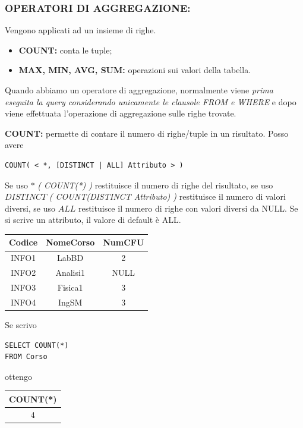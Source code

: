 \documentclass{article}
\begin{document}
\subsubsection{OPERATORI DI AGGREGAZIONE:}
Vengono applicati ad un insieme di righe. \begin{itemize}
	\item \textbf{COUNT:} conta le tuple;
	\item \textbf{MAX, MIN, AVG, SUM:} operazioni sui valori della tabella.
\end{itemize}

Quando abbiamo un operatore di aggregazione, normalmente viene \textit{prima eseguita la query considerando unicamente le clausole FROM e WHERE} e dopo viene effettuata l'operazione di aggregazione sulle righe trovate.

\textbf{COUNT:} permette di contare il numero di righe/tuple in un risultato. Posso avere 
\begin{lstlisting}[style=sqlstyle]
COUNT( < *, [DISTINCT | ALL] Attributo > ) 
\end{lstlisting} 

Se uso $*$ \textit{( COUNT(*) )} restituisce il numero di righe del risultato, se uso $DISTINCT$ \textit{( COUNT(DISTINCT Attributo) )} restituisce il numero di valori diversi, se uso $ALL$ restituisce il numero di righe con valori diversi da NULL. Se si scrive un attributo, il valore di default è ALL.

\begin{table}[h!]
	\begin{tabular}{|c|c|c|}
		\hline
		Codice & NomeCorso & NumCFU \\
		\hline
		INFO1 & LabBD & 2 \\
		\hline
		INFO2 & Analisi1 & NULL \\
		\hline
		INFO3 & Fisica1 & 3 \\
		\hline
		INFO4 & IngSM & 3 \\
		\hline
	\end{tabular}
\end{table}

Se scrivo \hfill\begin{minipage}{0.33\textwidth}
\begin{lstlisting}[style=sqlstyle]
SELECT COUNT(*)
FROM Corso 
\end{lstlisting}
\end{minipage}
\hfill
ottengo\hfill
\begin{minipage}{0.33\textwidth}
	\begin{tabular}{|c|}
		\hline
	\textbf{	COUNT(*)} \\
		\hline
		4\\
		\hline
	\end{tabular} 
\end{minipage}
\end{document}

